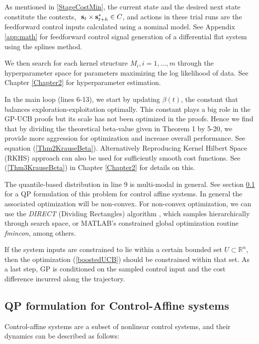 As mentioned in \ref{StageCostMin}, the current state and the desired next state constitute the contexts, $\ \mathbf{s}_t \times \mathbf{s}^{*}_{t+h} \in C$, and actions in these trial runs are the feedforward control inputs calculated using a nominal model. See Appendix \ref{app:math} for feedforward control signal generation of a differential flat system using the splines method. 

We then search for each kernel structure $\mathit{M}_i, i = 1, \ldots, m $ through the hyperparameter space for parameters maximizing the log likelihood of data. See Chapter \ref{Chapter2} for hyperparameter estimation.

In the main loop (lines 6-13), we start by updating $\beta(t)$, the constant that balances exploration-exploitation optimally. This constant plays a big role in the GP-UCB proofs \cite{Krause1} but its scale has not been optimized in the proofs. Hence we find that by dividing the theoretical beta-value given in Theorem 1 \cite{Krause1} by 5-20, we provide more aggression for optimization and increase overall performance. See equation (\ref{Thm2KrauseBeta}). Alternatively Reproducing Kernel Hilbert Space (RKHS) approach can also be used for sufficiently smooth cost functions. 
See (\ref{Thm3KrauseBeta}) in Chapter \ref{Chapter2} for details on this. 

The quantile-based distribution in line 9 is multi-modal in general. See section \ref{ControlAffine} for a QP formulation of this problem for control affine systems. In general the associated optimization will be non-convex. For non-convex optimization, we can use the \emph{DIRECT} (Dividing Rectangles) algorithm \cite{Jones:1993,Brochu}, which samples hierarchically through search space, or MATLAB's constrained global optimization routine \emph{fmincon}, among others.

If the system inputs are constrained to lie within a certain bounded set $U \subset \mathbb{R}^{n}$, then the optimization (\ref{boostedUCB}) should be constrained within that set. As a last step, GP is conditioned on the sampled control input and the cost difference incurred along the trajectory.  

\subsection{QP formulation for Control-Affine systems}
\label{ControlAffine}

Control-affine systems are a subset of nonlinear control systems, and their dynamics can be described as follows:

